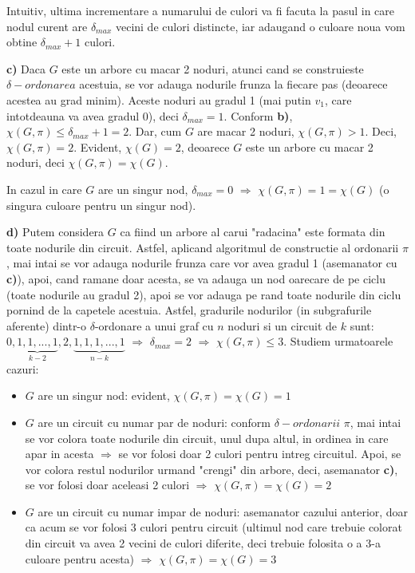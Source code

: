 \documentclass{article}
\begin{document}
Intuitiv, ultima incrementare a numarului de culori va fi facuta la pasul in care nodul curent are $\delta_{max}$ vecini de culori distincte, iar adaugand o culoare noua vom obtine $\delta_{max}+1$ culori.

{\bf c)} Daca $G$ este un arbore cu macar 2 noduri, atunci cand se construieste $\delta-ordonarea$ acestuia, se vor adauga nodurile frunza la fiecare pas (deoarece acestea au grad minim). Aceste noduri au gradul 1 (mai putin $v_1$, care intotdeauna va avea gradul 0), deci $\delta_{max} = 1$. Conform {\bf b)}, $\chi(G, \pi) \leq \delta_{max} + 1 = 2$. Dar, cum $G$ are macar 2 noduri, $\chi(G, \pi) > 1$. Deci, $\chi(G, \pi) = 2$. Evident, $\chi(G) = 2$, deoarece $G$ este un arbore cu macar 2 noduri, deci $\chi(G, \pi) = \chi(G)$.

In cazul in care $G$ are un singur nod, $\delta_{max} = 0$ $\Rightarrow$ $\chi(G, \pi) = 1 = \chi(G)$ (o singura culoare pentru un singur nod).

{\bf d)} Putem considera $G$ ca fiind un arbore al carui "radacina" este formata din toate nodurile din circuit. Astfel, aplicand algoritmul de constructie al ordonarii $\pi$, mai intai se vor adauga nodurile frunza care vor avea gradul 1 (asemanator cu {\bf c)}), apoi, cand ramane doar acesta, se va adauga un nod oarecare de pe ciclu (toate nodurile au gradul 2), apoi se vor adauga pe rand toate nodurile din ciclu pornind de la capetele acestuia. Astfel, gradurile nodurilor (in subgrafurile aferente) dintr-o $\delta$-ordonare a unui graf cu $n$ noduri si un circuit de $k$ sunt: $0, \underbrace{1, 1,..., 1}_{k-2},2, \underbrace{1, 1, 1, ... ,1}_{n-k}$ $\Rightarrow$ $\delta_{max} = 2$ $\Rightarrow$ $\chi(G, \pi) \leq 3$. Studiem urmatoarele cazuri:
\begin{itemize}
    \item $G$ are un singur nod: evident, $\chi(G, \pi) = \chi(G) = 1$
    \item $G$ are un circuit cu numar par de noduri: conform $\delta-ordonarii$ $\pi$, mai intai se vor colora toate nodurile din circuit, unul dupa altul, in ordinea in care apar in acesta $\Rightarrow$ se vor folosi doar 2 culori pentru intreg circuitul. Apoi, se vor colora restul nodurilor urmand "crengi" din arbore, deci, asemanator {\bf c)}, se vor folosi doar aceleasi 2 culori $\Rightarrow$ $\chi(G, \pi) = \chi(G) = 2$
    \item $G$ are un circuit cu numar impar de noduri: asemanator cazului anterior, doar ca acum se vor folosi 3 culori pentru circuit (ultimul nod care trebuie colorat din circuit va avea 2 vecini de culori diferite, deci trebuie folosita o a 3-a culoare pentru acesta) $\Rightarrow$ $\chi(G, \pi) = \chi(G) = 3$
\end{itemize}
\end{document}
